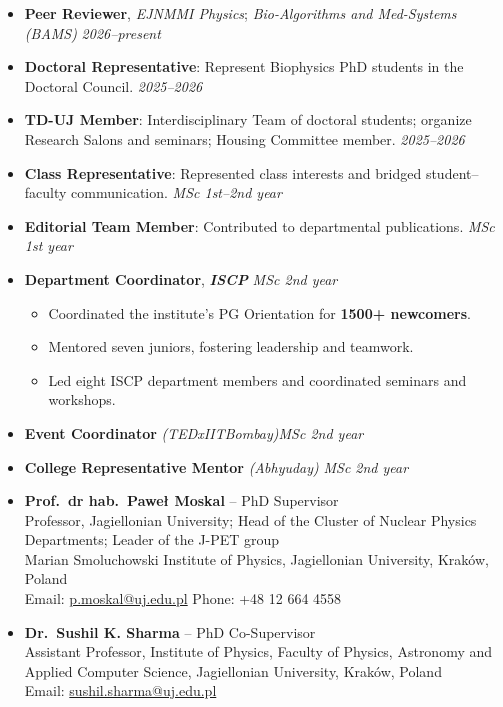 \noindent {}
\begin{itemize}
    \item \textbf{Peer Reviewer}, \emph{EJNMMI Physics}; \emph{Bio-Algorithms and Med-Systems (BAMS)} \hfill \emph{2026--present}
    \item \textbf{Doctoral Representative}: Represent Biophysics PhD students in the Doctoral Council. \hfill \emph{2025--2026}
    \item \textbf{TD-UJ Member}: Interdisciplinary Team of doctoral students; organize Research Salons and seminars; Housing Committee member. \hfill \emph{2025--2026}
    \item \textbf{Class Representative}: Represented class interests and bridged student--faculty communication. \hfill \emph{MSc 1st--2nd year}
    \item \textbf{Editorial Team Member}: Contributed to departmental publications. \hfill \emph{MSc 1st year}
    \item \textbf{Department Coordinator}, \textbf{\emph{ISCP}} \hfill \emph{MSc 2nd year}
    \begin{itemize}
        \item Coordinated the institute's PG Orientation for \textbf{1500+ newcomers}.
        \item Mentored seven juniors, fostering leadership and teamwork.
        \item Led eight ISCP department members and coordinated seminars and workshops.
    \end{itemize}
\end{itemize}

\noindent {}
\begin{itemize}
    \item \textbf{Event Coordinator} \emph{(TEDxIITBombay)}\hfill \emph{MSc 2nd year}
    \item \textbf{College Representative Mentor} \emph{(Abhyuday)} \hfill \emph{MSc 2nd year}
\end{itemize}


\noindent {}
\begin{itemize}
\item \textbf{Prof.\ dr hab.\ Pawe{\l} Moskal} -- PhD Supervisor\\
Professor, Jagiellonian University; Head of the Cluster of Nuclear Physics Departments; Leader of the J-PET group\\
Marian Smoluchowski Institute of Physics, Jagiellonian University, Krak{\'o}w, Poland\\
Email: \href{mailto:p.moskal@uj.edu.pl}{p.moskal@uj.edu.pl} \quad Phone: +48 12 664 4558
\item \textbf{Dr.\ Sushil K. Sharma} -- PhD Co-Supervisor\\
Assistant Professor, Institute of Physics, Faculty of Physics, Astronomy and Applied Computer Science, Jagiellonian University, Krak{\'o}w, Poland\\
Email: \href{mailto:sushil.sharma@uj.edu.pl}{sushil.sharma@uj.edu.pl}
\end{itemize}
